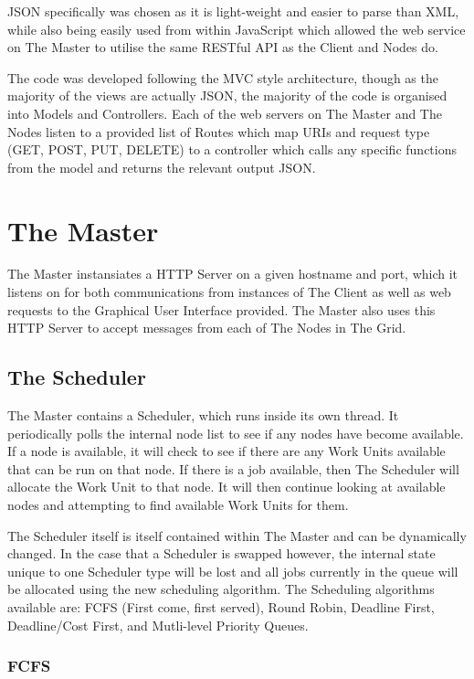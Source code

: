 JSON specifically was chosen as it is light-weight and easier to parse than XML, while also being easily used from within JavaScript which allowed the web service on The Master to utilise the same RESTful API as the Client and Nodes do. 

The code was developed following the MVC style architecture, though as the majority of the views are actually JSON, the majority of the code is organised into Models and Controllers. Each of the web servers on The Master and The Nodes listen to a provided list of Routes which map URIs and request type (GET, POST, PUT, DELETE) to a controller which calls any specific functions from the model and returns the relevant output JSON.

\section{The Master}
\label{themaster}

The Master instansiates a HTTP Server on a given hostname and port, which it listens on for both communications from instances of The Client as well as web requests to the Graphical User Interface provided. The Master also uses this HTTP Server to accept messages from each of The Nodes in The Grid. 

\subsection{The Scheduler}
\label{thescheduler}

The Master contains a Scheduler, which runs inside its own thread. It periodically polls the internal node list to see if any nodes have become available. If a node is available, it will check to see if there are any Work Units available that can be run on that node. If there is a job available, then The Scheduler will allocate the Work Unit to that node. It will then continue looking at available nodes and attempting to find available Work Units for them. 

The Scheduler itself is itself contained within The Master and can be dynamically changed. In the case that a Scheduler is swapped however, the internal state unique to one Scheduler type will be lost and all jobs currently in the queue will be allocated using the new scheduling algorithm. The Scheduling algorithms available are: FCFS (First come, first served), Round Robin, Deadline First, Deadline\slash Cost First, and Mutli-level Priority Queues. 

\subsubsection{FCFS}
\label{fcfs}

